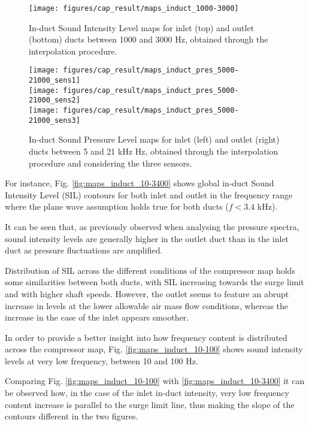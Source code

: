 \begin{figure}[tbh!]
\centering
\texttt{[image: figures/cap\_result/maps\_induct\_1000-3000]}
\vspace{-2.25cm}
\caption[In-duct SIL maps between 1000 and 3000 Hz]{In-duct Sound Intensity Level maps for inlet (top) and outlet (bottom) ducts between 1000 and 3000 Hz, obtained through the interpolation procedure.}
\label{fig:maps_induct_1000-3000}
\end{figure}

\begin{figure}[tbh!]
\centering
\texttt{[image: figures/cap\_result/maps\_induct\_pres\_5000-21000\_sens1]}\\[4mm]
\texttt{[image: figures/cap\_result/maps\_induct\_pres\_5000-21000\_sens2]}\\[4mm]
\texttt{[image: figures/cap\_result/maps\_induct\_pres\_5000-21000\_sens3]}
\caption[In-duct SPL maps between 5 and 21 kHz]{In-duct Sound Pressure Level maps for inlet (left) and outlet (right) ducts between 5 and 21 kHz Hz, obtained through the interpolation procedure and considering the three sensors.}
\label{fig:maps_induct_SPL_3sens}
\end{figure}

For instance, Fig. \ref{fig:maps_induct_10-3400} shows global in-duct Sound Intensity Level (SIL) contours for both inlet and outlet in the frequency range where the plane wave assumption holds true for both ducts ($f<3.4$ kHz). 

It can be seen that, as previously observed when analysing the pressure spectra, sound intensity levels are generally higher in the outlet duct than in the inlet duct as pressure fluctuations are amplified. 

Distribution of SIL across the different conditions of the compressor map holds some similarities between both ducts, with SIL increasing towards the surge limit and with higher shaft speeds. However, the outlet seems to feature an abrupt increase in levels at the lower allowable air mass flow conditions, whereas the increase in the case of the inlet appears smoother. 

In order to provide a better insight into how frequency content is distributed across the compressor map, Fig. \ref{fig:maps_induct_10-100} shows sound intensity levels at very low frequency, between 10 and 100 Hz.

Comparing Fig. \ref{fig:maps_induct_10-100} with \ref{fig:maps_induct_10-3400} it can be observed how, in the case of the inlet in-duct intensity, very low frequency content increase is parallel to the surge limit line, thus making the slope of the contours different in the two figures.

